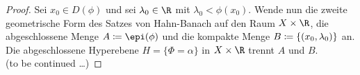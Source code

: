 \begin{proof}
    Sei $x_0\in D(\phi)$ und sei $\lambda_0\in\R$ mit $\lambda_0 < \phi(x_0)$.
    Wende nun die zweite geometrische Form des Satzes von Hahn-Banach
     auf den Raum $X\times\R$, die abgeschlossene
    Menge $A\defeq \epi(\phi)$ und die kompakte Menge $B\coloneqq
    \{(x_0,\lambda_0)\}$ an. Die abgeschlossene Hyperebene $H=\{ \Phi = \alpha \}$
    in $X\times\R$ trennt $A$ und $B$.
    \\[1ex]
    \phantom{\qedhere}\hfill{\footnotesize (to be continued \dots)}
\end{proof}
